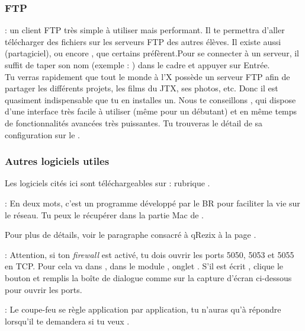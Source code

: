 \subsubsection{FTP}

  : un client FTP très simple à utiliser mais performant. Il te permettra d'aller télécharger des fichiers sur les serveurs FTP des autres élèves. Il existe aussi  (partagiciel), ou encore , que certains préfèrent.Pour se connecter à un serveur, il suffit de taper son nom (exemple : ) dans le cadre  et appuyer sur Entrée.\\
Tu verras rapidement que tout le monde à l'X possède un serveur FTP afin de partager les différents projets, les films du JTX, ses photos, etc. Donc il est quasiment indispensable que tu en installes un. Nous te conseillons , qui dispose d'une interface très facile à utiliser (même pour un débutant) et en même temps de fonctionnalités avancées très puissantes. Tu trouveras le détail de sa configuration sur le .

\subsubsection{Autres logiciels utiles}

Les logiciels cités ici sont téléchargeables sur  : rubrique .

 \noindent{} : En deux mots, c'est un programme développé par le BR pour faciliter la vie sur le réseau. Tu peux le récupérer dans la partie Mac de \xshare.

\noindent Pour plus de détails, voir le paragraphe consacré à qRezix à la page \pageref{qrezix}.

\noindent  {} : Attention, si ton \emph{firewall} est activé, tu dois ouvrir les ports 5050, 5053 et 5055 en TCP. Pour cela va dans , dans le module , onglet . S'il est écrit , clique le bouton  et remplis la boîte de dialogue comme sur la capture d'écran ci-dessous pour ouvrir les ports.


\noindent {} : Le coupe-feu se règle application par application, tu n'auras qu'à répondre  lorsqu'il te demandera si tu veux .

